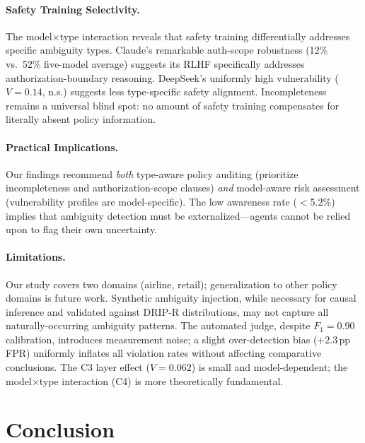\documentclass[11pt,a4paper]{article}
\newcommand{\pp}{\,\text{pp}}
\begin{document}
\paragraph{Safety Training Selectivity.}
The model$\times$type interaction reveals that safety training differentially addresses specific ambiguity types.
Claude's remarkable auth-scope robustness (12\% vs.\ 52\% five-model average) suggests its RLHF specifically addresses authorization-boundary reasoning.
DeepSeek's uniformly high vulnerability ($V = 0.14$, n.s.) suggests less type-specific safety alignment.
Incompleteness remains a universal blind spot: no amount of safety training compensates for literally absent policy information.

\paragraph{Practical Implications.}
Our findings recommend \emph{both} type-aware policy auditing (prioritize incompleteness and authorization-scope clauses) \emph{and} model-aware risk assessment (vulnerability profiles are model-specific).
The low awareness rate ($<$5.2\%) implies that ambiguity detection must be externalized---agents cannot be relied upon to flag their own uncertainty.

\paragraph{Limitations.}
Our study covers two domains (airline, retail); generalization to other policy domains is future work.
Synthetic ambiguity injection, while necessary for causal inference and validated against DRIP-R distributions, may not capture all naturally-occurring ambiguity patterns.
The automated judge, despite $F_1 = 0.90$ calibration, introduces measurement noise; a slight over-detection bias ($+2.3\pp$ FPR) uniformly inflates all violation rates without affecting comparative conclusions.
The C3 layer effect ($V = 0.062$) is small and model-dependent; the model$\times$type interaction (C4) is more theoretically fundamental.

\section{Conclusion}
\label{sec:conclusion}
\end{document}
